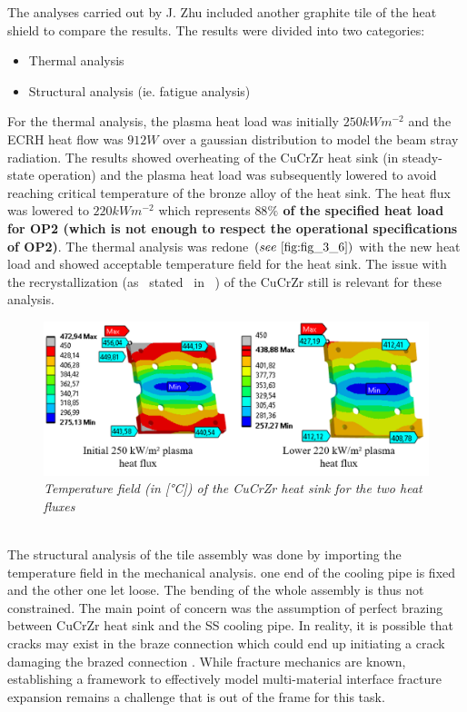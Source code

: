 \normalsize{\indent The analyses carried out by J. Zhu included another graphite tile of the heat shield to compare the results. The results were divided into two categories:
\begin{itemize}
    \item Thermal analysis
    \item Structural analysis (ie. fatigue analysis)
\end{itemize}
For the thermal analysis, the plasma heat load was initially $250 \unit{kWm^{-2}}$ and the \acrshort{ECRH} heat flow was $912 \unit{W}$ over a gaussian distribution to model the beam stray radiation. The results showed overheating of the \acrshort{CuCrZr} heat sink (in steady-state operation) and the plasma heat load was subsequently lowered to avoid reaching critical temperature of the bronze alloy of the heat sink. The heat flux was lowered to $220 \unit{kWm^{-2}}$ which represents {\bfseries $88 \unit{\%}$ of the specified heat load for \acrshort{OP2} (which is not enough to respect the operational specifications of \acrshort{OP2})}. The thermal analysis was redone $(see \ \ref{fig:fig_3_6})$ with the new heat load and showed acceptable temperature field for the heat sink. The issue with the recrystallization (as \ stated \ in \ \cite{Fellinger_2013}) of the \acrshort{CuCrZr} still is relevant for these analysis.}
\begin{figure}[h!]
    \centering
    \includegraphics[width=1\textwidth]{figures/jZhuHS250vs220II.png}
    \caption{\it Temperature field (in [\si{\degree}C]) of the \acrshort{CuCrZr} heat sink for the two heat fluxes \cite{zhu_parametric_2019}}
    \label{fig:fig_3_6}
\end{figure}
\\
\break
\normalsize{\indent The structural analysis of the tile assembly was done by importing the temperature field in the mechanical analysis. one end of the cooling pipe is fixed and the other one let loose. The bending of the whole assembly is thus not constrained. The main point of concern was the assumption of perfect brazing between \acrshort{CuCrZr} heat sink and the \acrshort{SS} cooling pipe. In reality, it is possible that cracks may exist in the braze connection which could end up initiating a crack damaging the brazed connection \cite{zhu_parametric_2019}. While fracture mechanics are known, establishing a framework to effectively model multi-material interface fracture expansion remains a challenge that is out of the frame for this task.}
